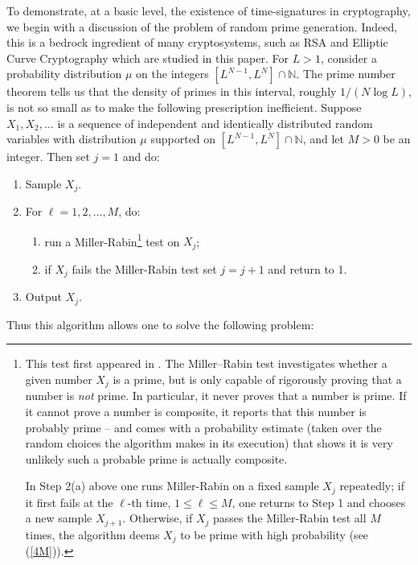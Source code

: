 \documentclass{llncs}
\numberwithin{equation}{section}
\renewcommand\({\left(}
\renewcommand\){\right)}
\begin{document}
To demonstrate, at a basic level, the existence of time-signatures in cryptography, we begin with a discussion of the problem of random prime generation.  Indeed, this is a bedrock ingredient of many cryptosystems, such as RSA and Elliptic Curve Cryptography which are studied in this paper.
For $L > 1$, consider a probability distribution $\mu$  on the integers $[L^{N-1},L^N] \cap \mathbb N$.  The prime number theorem tells us that
the density of primes in this interval, roughly $1/(N \log L)$, is not so small  as to make the following prescription   inefficient.  Suppose $X_1,X_2,\ldots$ is a sequence of independent and identically distributed random variables with distribution $\mu$ supported on $[L^{N-1},L^N] \cap \mathbb N$, and let $M > 0$ be an integer.
Then set $j = 1$ and do:
\begin{enumerate}
\item Sample $X_j$.
\item For $\ell = 1,2,\ldots,M$, do:
  \begin{enumerate}
  \item run a Miller-Rabin\footnote{This test first appeared in \cite{rabin}. The Miller--Rabin test investigates whether a given number $X_j$ is a prime, but is only capable of rigorously proving that a number is {\it not} prime.  In particular, it never proves that a number is prime.  If it cannot prove a number is composite, it reports that this number is probably prime -- and  comes with a probability estimate (taken over the random choices the algorithm makes in its execution) that shows it is very unlikely such a probable prime is actually composite.

   In Step 2(a) above one runs Miller-Rabin on a fixed sample $X_j$ repeatedly;
  if it first fails at the $\ell$-th time, $1 \le \ell \le M$, one returns to Step 1 and chooses a new sample $X_{j+1}$. Otherwise, if $X_j$ passes the Miller-Rabin test all $M$ times, the algorithm deems $X_j$ to be prime with high probability (see (\ref{4M})).}
  test on $X_j$;
  \item if $X_j$ fails the Miller-Rabin test set $j = j+1$ and return to 1.
  \end{enumerate}
\item Output $X_j$.
\end{enumerate}

\noindent
Thus this  algorithm allows one to solve the following problem:
  \vspace{.09cm}
\end{document}
